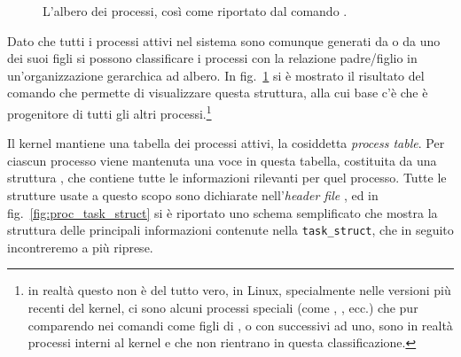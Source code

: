 \begin{figure}[!htb]
  \footnotesize
{}
  \caption{L'albero dei processi, così come riportato dal comando
    .}
  \label{fig:proc_tree}
\end{figure}

Dato che tutti i processi attivi nel sistema sono comunque generati da
 o da uno dei suoi figli si possono classificare i processi con la
relazione padre/figlio in un'organizzazione gerarchica ad albero. In
fig.~\ref{fig:proc_tree} si è mostrato il risultato del comando 
che permette di visualizzare questa struttura, alla cui base c'è 
che è progenitore di tutti gli altri processi.\footnote{in realtà questo non è
  del tutto vero, in Linux, specialmente nelle versioni più recenti del
  kernel, ci sono alcuni processi speciali (come , ,
  ecc.) che pur comparendo nei comandi come figli di , o con
   successivi ad uno, sono in realtà processi interni al kernel e che
  non rientrano in questa classificazione.}


Il kernel mantiene una tabella dei processi attivi, la cosiddetta
\textit{process table}. Per ciascun processo viene mantenuta una voce in
questa tabella, costituita da una struttura , che
contiene tutte le informazioni rilevanti per quel processo. Tutte le strutture
usate a questo scopo sono dichiarate nell'\textit{header file}
, ed in fig.~\ref{fig:proc_task_struct} si è riportato uno
schema semplificato che mostra la struttura delle principali informazioni
contenute nella \texttt{task\_struct}, che in seguito incontreremo a più
riprese.

